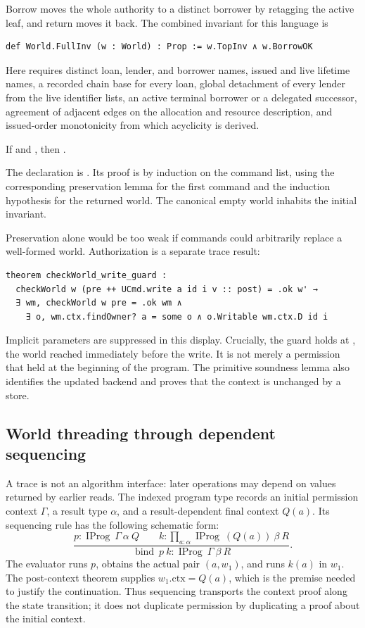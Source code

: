 \documentclass[a4paper,UKenglish,cleveref]{lipics-v2021}
\begin{document}
Borrow moves the whole authority to a distinct borrower by retagging the active
leaf, and return moves it back. The combined invariant for this language is
\begin{lstlisting}
def World.FullInv (w : World) : Prop := w.TopInv ∧ w.BorrowOK
\end{lstlisting}
Here  requires distinct loan, lender, and borrower names, issued
and live lifetime names, a recorded chain base for every loan, global detachment
of every lender from the live identifier lists, an active terminal borrower or a
delegated successor, agreement of adjacent edges on the allocation and resource
description, and issued-order monotonicity from which acyclicity is derived.

\begin{theorem}
If  and , then
.
\end{theorem}
The declaration is . Its proof is by induction
on the command list, using the corresponding preservation lemma for the first
command and the induction hypothesis for the returned world. The canonical
empty world inhabits the initial invariant.

Preservation alone would be too weak if commands could arbitrarily replace a
well-formed world. Authorization is a separate trace result:
\begin{lstlisting}
theorem checkWorld_write_guard :
  checkWorld w (pre ++ UCmd.write a id i v :: post) = .ok w' →
  ∃ wm, checkWorld w pre = .ok wm ∧
    ∃ o, wm.ctx.findOwner? a = some o ∧ o.Writable wm.ctx.D id i
\end{lstlisting}
Implicit parameters are suppressed in this display. Crucially, the guard holds
at , the world reached immediately before the write. It is not merely
a permission that held at the beginning of the program. The primitive soundness
lemma also identifies the updated backend and proves that the context is
unchanged by a store.

\subsection{World threading through dependent sequencing}

A trace is not an algorithm interface: later operations may depend on values
returned by earlier reads. The indexed program type  records
an initial permission context $\Gamma$, a result type $\alpha$, and a
result-dependent final context $Q(a)$. Its sequencing rule has the following
schematic form:
\[
\frac{p:\operatorname{IProg}\ \Gamma\ \alpha\ Q\qquad
      k:\prod_{a:\alpha}\operatorname{IProg}\ (Q(a))\ \beta\ R}
     {\operatorname{bind}\ p\ k:\operatorname{IProg}\ \Gamma\ \beta\ R}.
\]
The evaluator runs $p$, obtains the actual pair $(a,w_1)$, and runs $k(a)$ in
$w_1$. The post-context theorem supplies $w_1.\mathrm{ctx}=Q(a)$, which is the
premise needed to justify the continuation. Thus sequencing transports the
context proof along the state transition; it does not duplicate permission by
duplicating a proof about the initial context.
\end{document}
